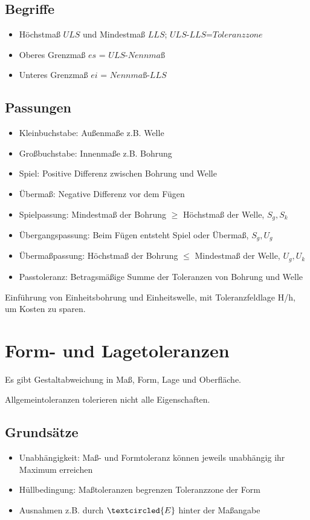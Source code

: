 \documentclass[a4paper,DIV=15,fontsize=11pt]{scrartcl}
\begin{document}
\subsection{Begriffe}
\begin{itemize}
	\item Höchstmaß $ULS$ und Mindestmaß $LLS$; $ULS$-$LLS$=$Toleranzzone$
	\item Oberes Grenzmaß $es$ = $ULS$-$Nennmaß$
	\item Unteres Grenzmaß $ei$ = $Nennmaß$-$LLS$
\end{itemize}
	
\subsection{Passungen}
\begin{itemize}
	\item Kleinbuchstabe: Außenmaße z.B. Welle
	\item Großbuchstabe: Innenmaße z.B. Bohrung
	\item Spiel: Positive Differenz zwischen Bohrung und Welle
	\item Übermaß: Negative Differenz vor dem Fügen
	\item Spielpassung: Mindestmaß der Bohrung $\geq$ Höchstmaß der Welle, $S_g,S_k$
	\item Übergangspassung: Beim Fügen entsteht Spiel oder Übermaß, $S_g,U_g$
	\item Übermaßpassung: Höchstmaß der Bohrung $\leq$ Mindestmaß der Welle, $U_g,U_k$
	\item Passtoleranz: Betragsmäßige Summe der Toleranzen von Bohrung und Welle
\end{itemize}
Einführung von Einheitsbohrung und Einheitswelle, mit Toleranzfeldlage H/h, um Kosten zu sparen. 
	
\section{Form- und Lagetoleranzen}
Es gibt Gestaltabweichung in Maß, Form, Lage und Oberfläche.
	
Allgemeintoleranzen tolerieren nicht alle Eigenschaften.
\subsection{Grundsätze}
\begin{itemize}
	\item Unabhängigkeit: Maß- und Formtoleranz können jeweils unabhängig ihr Maximum erreichen
	\item Hüllbedingung: Maßtoleranzen begrenzen Toleranzzone der Form
	\item Ausnahmen z.B. durch $\textcircled{\tiny E}$ hinter der Maßangabe
\end{itemize}
	
\end{document}
